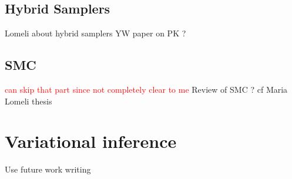 \subsection{Hybrid Samplers}
Lomeli about hybrid samplers
YW paper on PK ?

\subsection{SMC}
\textcolor{red}{can skip that part since not completely clear to me}
Review of SMC ?
cf Maria Lomeli thesis


\section{Variational inference}
Use future work writing
